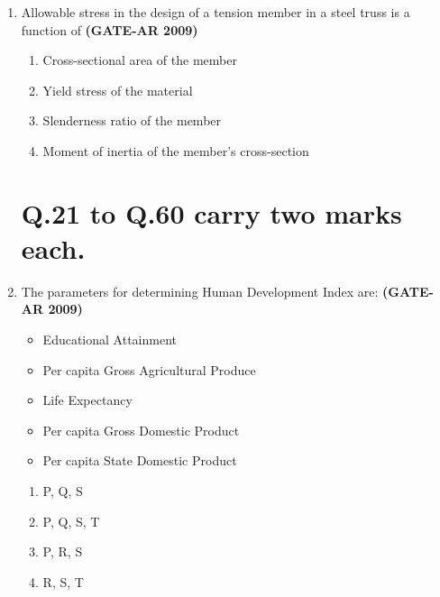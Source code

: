 \documentclass[a4paper,10pt]{article}
\begin{document}
\begin{enumerate}
	\item Allowable stress in the design of a tension member in a steel truss is a function of \hfill \textbf{(GATE-AR 2009)}
    \begin{enumerate}
        \item Cross-sectional area of the member
        \item Yield stress of the material
        \item Slenderness ratio of the member
        \item Moment of inertia of the member's cross-section
    \end{enumerate}

\section*{Q.21 to Q.60 carry two marks each.}

    \item The parameters for determining Human Development Index are: \hfill \textbf{(GATE-AR 2009)}
    \begin{itemize}
        \item Educational Attainment
        \item Per capita Gross Agricultural Produce
        \item Life Expectancy
        \item Per capita Gross Domestic Product
        \item Per capita State Domestic Product
    \end{itemize}
    \begin{multicols}{4}
	\begin{enumerate}
        \item P, Q, S
        \item P, Q, S, T
        \item P, R, S
        \item R, S, T
    \end{enumerate}
	\end{multicols}
    

\end{enumerate}
\end{document}
